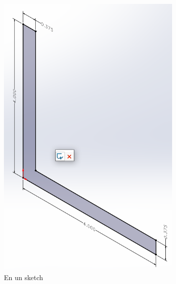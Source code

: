 \documentclass{report}
\begin{document}
\begin{figure}[H]
	\centering
	\begin{subfigure}[b]{0.35\textwidth}
		\includegraphics[width=\textwidth]{Imagenes/solidworks_breadcrumbs_03}
		\caption{En un sketch}
		\label{fig:solidworksbreadcrumbs03}
	\end{subfigure}
	\begin{subfigure}[b]{0.45\textwidth}

\end{subfigure}
\end{figure}
\end{document}

